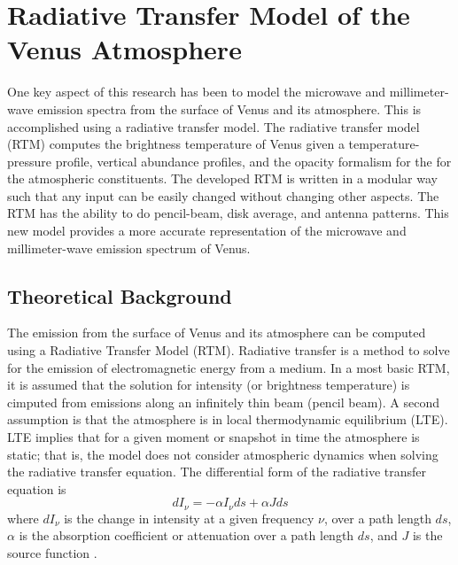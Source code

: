 \chapter{Radiative Transfer Model of the Venus Atmosphere}


One key aspect of this research has been to model the microwave and millimeter-wave emission spectra from the surface of Venus and its atmosphere. This is accomplished using a radiative transfer model. The radiative transfer model (RTM) computes the brightness temperature of Venus given a temperature-pressure profile, vertical abundance profiles, and the opacity formalism for the for the atmospheric constituents. The developed RTM is written in a modular way such that any input can be easily changed without changing other aspects. The RTM has the ability to do pencil-beam, disk average, and antenna patterns. This new model provides a more accurate representation of the microwave and millimeter-wave emission spectrum of Venus. 

\section{Theoretical Background}

The emission from the surface of Venus and its atmosphere can be computed using a Radiative Transfer Model (RTM). Radiative transfer is a method to solve for the emission of electromagnetic energy from a medium. In a most basic RTM, it is assumed that the solution for intensity (or brightness temperature) is cimputed from emissions along an infinitely thin beam (pencil beam). A second assumption is that the atmosphere is in local thermodynamic equilibrium (LTE). LTE implies that for a given moment or snapshot in time the atmosphere is static; that is, the model does not consider atmospheric dynamics when solving the radiative transfer equation. The differential form of the radiative transfer equation is
\begin{equation}\label{eq:rtm-diff}
dI_{\nu}= -\alpha I_{\nu }ds + \alpha J ds
\end{equation}
 where $dI_\nu$ is the change in intensity at a given frequency $\nu$, over a path length $ds$, $\alpha$ is the absorption coefficient or attenuation over a path length $ds$, and $J$ is the source function \cite{Liou-2002}. 

